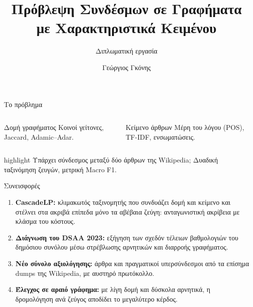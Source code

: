 \documentclass[11pt,aspectratio=169]{beamer}
\title{Πρόβλεψη Συνδέσμων σε Γραφήματα με Χαρακτηριστικά Κειμένου}
\subtitle{Διπλωματική εργασία}
\author{Γεώργιος Γκόνης}
\institute{Τμήμα Μηχανικών Η/Υ \& Πληροφορικής, Πανεπιστήμιο Πατρών\\[0.4em]
  Επιβλέπων: Χρήστος Μακρής}
\date{}
\newcommand{\en}[1]{\foreignlanguage{english}{#1}}
\newcommand{\takeaway}[1]{%
  \begin{beamercolorbox}[wd=\linewidth,sep=0.65em,rounded=true]{highlight}
    \centering #1
  \end{beamercolorbox}}
\begin{document}
\begin{frame}
  \titlepage
\end{frame}


\begin{frame}{Το πρόβλημα}
  \vspace{0.2cm}
  \begin{center}
  \end{center}
  \vspace{0.5cm}
  \begin{columns}[T,onlytextwidth]
      \begin{block}{Δομή γραφήματος}
        Κοινοί γείτονες, \en{Jaccard}, \en{Adamic--Adar}.
      \end{block}
      \begin{block}{Κείμενο άρθρων}
        Μέρη του λόγου (\en{POS}), \en{TF-IDF}, ενσωματώσεις.
      \end{block}
  \end{columns}
  \vspace{0.4cm}
  \takeaway{Υπάρχει σύνδεσμος μεταξύ δύο άρθρων της \en{Wikipedia};
    Δυαδική ταξινόμηση ζευγών, μετρική \en{Macro F1}.}
\end{frame}

\begin{frame}{Συνεισφορές}
  \vspace{0.3cm}
  \begin{enumerate}
    \setlength{\itemsep}{0.55cm}
    \item \textbf{\en{CascadeLP}:} κλιμακωτός ταξινομητής που συνδυάζει δομή
      και κείμενο και στέλνει στα ακριβά επίπεδα μόνο τα αβέβαια ζεύγη:
      ανταγωνιστική ακρίβεια με κλάσμα του κόστους.
    \item \textbf{Διάγνωση του \en{DSAA 2023}:} εξήγηση των σχεδόν τέλειων
      βαθμολογιών του δημόσιου συνόλου μέσω στρέβλωσης αρνητικών και
      διαρροής γραφήματος.
    \item \textbf{Νέο σύνολο αξιολόγησης:} \WfCrawlNodes{} άρθρα και
      \WfCrawlEdges{} πραγματικοί υπερσύνδεσμοι από τα επίσημα
      \en{dumps} της \en{Wikipedia}, με αυστηρό πρωτόκολλο.
    \item \textbf{Έλεγχος σε αραιό γράφημα:} με λίγη δομή και δύσκολα
      αρνητικά, η δρομολόγηση ανά ζεύγος αποδίδει το μεγαλύτερο κέρδος.
  \end{enumerate}
\end{frame}
\end{document}
